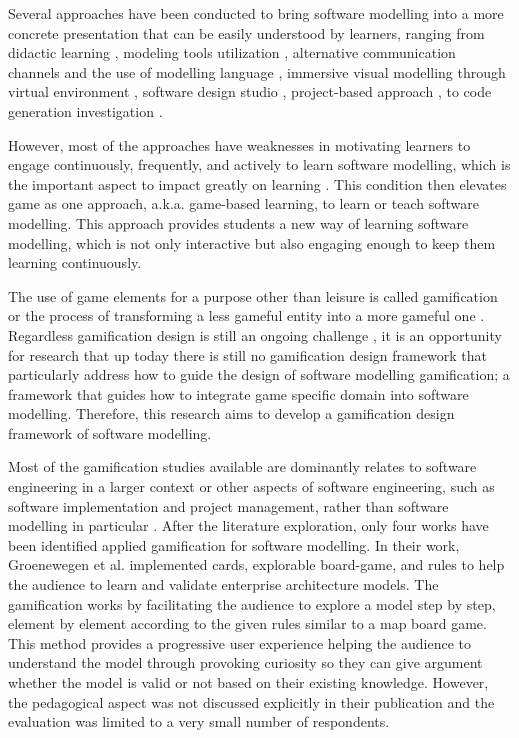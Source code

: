 \documentclass[runningheads,a4paper]{llncs}
\begin{document}
Several approaches have been conducted to bring software modelling into a more concrete presentation that can be easily understood by learners, ranging from didactic learning \cite{moisan2009teaching}, modeling tools utilization \cite{Akayama2013}, alternative communication channels and the use of modelling language \cite{Brandsteidl2011}, immersive visual modelling through virtual environment \cite{neubauer2003immersive}, software design studio \cite{Whittle2014}, project-based approach \cite{Szmurlo2007}, to code generation investigation \cite{schmidt2014teaching}.

However, most of the approaches have weaknesses in motivating learners to engage continuously, frequently, and actively to learn software modelling, which is the important aspect to impact greatly on learning \cite{Naps2005}. This condition then elevates game as one approach, a.k.a. game-based learning, to learn or teach software modelling. This approach provides students a new way of learning software modelling, which is not only interactive but also engaging enough to keep them learning continuously. 

The use of game elements for a purpose other than leisure is called gamification \cite{deterding2011game} or  the process of transforming a less gameful entity into a more gameful one \cite{Werbach2014} \cite{Kapp2012} \cite{Yohannis2014}. Regardless gamification design is still an ongoing challenge \cite{Deterding2013}, it is an opportunity for research that up today there is still no gamification design framework that particularly address how to guide the design of software modelling gamification; a framework that guides how to integrate game specific domain into software modelling. Therefore, this research aims to develop a gamification design framework of software modelling.

Most of the gamification studies available are dominantly relates to software engineering in a larger context or other aspects of software engineering, such as software implementation and project management, rather than software modelling in particular \cite{Pedreira2015}. After the literature exploration, only four works have been identified applied gamification for software modelling. In their work, Groenewegen et al. \cite{Groenewegen2010} implemented cards, explorable board-game, and rules to help the audience to learn and validate enterprise architecture models. The gamification works by facilitating the audience to explore a model step by step, element by element according to the given rules similar to a map board game. This method provides a progressive user experience helping the audience to understand the model through provoking curiosity so they can give argument whether the model is valid or not based on their existing knowledge. However, the pedagogical aspect was not discussed explicitly  in their publication and the evaluation was limited to a very small number of respondents. 
\end{document}
